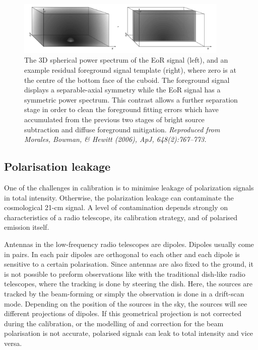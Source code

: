 \begin{figure}
\begin{center}
    \includegraphics[width=0.9\textwidth]{Chapman_Jelic/Images/res_sub.png}
\end{center}
    \caption{The 3D spherical power spectrum of the EoR signal (left), and an example residual foreground signal template (right), where zero is at the centre of the bottom face of the cuboid. The foreground signal displays a separable-axial symmetry while the EoR signal has a symmetric power spectrum. This contrast allows a further separation stage in order to clean the foreground fitting errors which have accumulated from the previous two stages of bright source subtraction and diffuse foreground mitigation. \textit{Reproduced from Morales, Bowman, & Hewitt (2006), ApJ, 648(2):767–773.}}
    \label{fig:ressub}
\end{figure}

\subsection{Polarisation leakage}\label{sec:leakage}
One of the challenges in calibration is to minimise leakage of polarization signals in total intensity. Otherwise, the polarization leakage can contaminate the cosmological 21-cm signal. 
A level of contamination depends strongly on characteristics of a radio telescope, its calibration strategy, and of polarised emission itself.

Antennas in the low-frequency radio telescopes are dipoles. Dipoles usually come in pairs. In each pair dipoles are orthogonal to each other and each dipole is sensitive to a certain polarisation. Since antennas are also fixed to the ground, it is not possible to preform observations like with the traditional dish-like radio telescopes, where the tracking  is done by steering the dish. Here, the sources are tracked by the beam-forming or simply the observation is done in a drift-scan mode. Depending on the position of the sources in the sky, the sources will see different projections of dipoles. If this geometrical projection  is not corrected during the calibration, or the modelling of and correction for the beam polarisation is not accurate, polarised signals can leak to total intensity and vice versa. 

